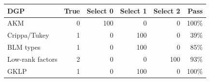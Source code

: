\begin{tabular}{lrrrrr}
\toprule
DGP & True & Select 0 & Select 1 & Select 2 & Pass \\
\midrule
AKM & 0 & 100 & 0 & 0 & 100\% \\
Crippa/Tukey & 1 & 0 & 100 & 0 & 39\% \\
BLM types & 1 & 0 & 100 & 0 & 85\% \\
Low-rank factors & 2 & 0 & 0 & 100 & 93\% \\
GKLP & 1 & 0 & 100 & 0 & 100\% \\
\bottomrule
\end{tabular}

